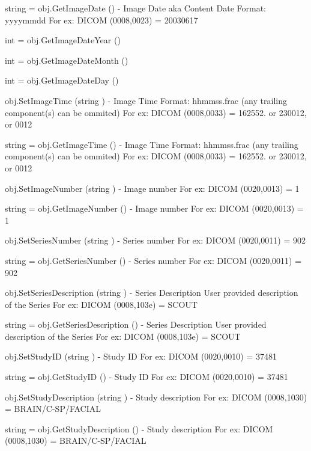 \begin{DoxyItemize}
\item {\ttfamily string = obj.\-Get\-Image\-Date ()} -\/ Image Date aka Content Date Format\-: yyyymmdd For ex\-: D\-I\-C\-O\-M (0008,0023) = 20030617  
\item {\ttfamily int = obj.\-Get\-Image\-Date\-Year ()}  
\item {\ttfamily int = obj.\-Get\-Image\-Date\-Month ()}  
\item {\ttfamily int = obj.\-Get\-Image\-Date\-Day ()}  
\item {\ttfamily obj.\-Set\-Image\-Time (string )} -\/ Image Time Format\-: hhmmss.\-frac (any trailing component(s) can be ommited) For ex\-: D\-I\-C\-O\-M (0008,0033) = 162552. or 230012, or 0012  
\item {\ttfamily string = obj.\-Get\-Image\-Time ()} -\/ Image Time Format\-: hhmmss.\-frac (any trailing component(s) can be ommited) For ex\-: D\-I\-C\-O\-M (0008,0033) = 162552. or 230012, or 0012  
\item {\ttfamily obj.\-Set\-Image\-Number (string )} -\/ Image number For ex\-: D\-I\-C\-O\-M (0020,0013) = 1  
\item {\ttfamily string = obj.\-Get\-Image\-Number ()} -\/ Image number For ex\-: D\-I\-C\-O\-M (0020,0013) = 1  
\item {\ttfamily obj.\-Set\-Series\-Number (string )} -\/ Series number For ex\-: D\-I\-C\-O\-M (0020,0011) = 902  
\item {\ttfamily string = obj.\-Get\-Series\-Number ()} -\/ Series number For ex\-: D\-I\-C\-O\-M (0020,0011) = 902  
\item {\ttfamily obj.\-Set\-Series\-Description (string )} -\/ Series Description User provided description of the Series For ex\-: D\-I\-C\-O\-M (0008,103e) = S\-C\-O\-U\-T  
\item {\ttfamily string = obj.\-Get\-Series\-Description ()} -\/ Series Description User provided description of the Series For ex\-: D\-I\-C\-O\-M (0008,103e) = S\-C\-O\-U\-T  
\item {\ttfamily obj.\-Set\-Study\-I\-D (string )} -\/ Study I\-D For ex\-: D\-I\-C\-O\-M (0020,0010) = 37481  
\item {\ttfamily string = obj.\-Get\-Study\-I\-D ()} -\/ Study I\-D For ex\-: D\-I\-C\-O\-M (0020,0010) = 37481  
\item {\ttfamily obj.\-Set\-Study\-Description (string )} -\/ Study description For ex\-: D\-I\-C\-O\-M (0008,1030) = B\-R\-A\-I\-N/\-C-\/\-S\-P/\-F\-A\-C\-I\-A\-L  
\item {\ttfamily string = obj.\-Get\-Study\-Description ()} -\/ Study description For ex\-: D\-I\-C\-O\-M (0008,1030) = B\-R\-A\-I\-N/\-C-\/\-S\-P/\-F\-A\-C\-I\-A\-L  

\end{DoxyItemize}
